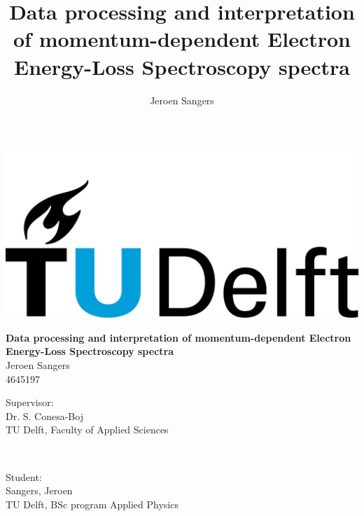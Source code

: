\begin{titlepage}

\title{ \huge \bfseries Data processing and interpretation of momentum-dependent Electron Energy-Loss Spectroscopy spectra  }
\author{Jeroen Sangers}

\maketitle

\thispagestyle{empty}

\vspace{10cm}

\begin{center}
    \includegraphics[width=0.4\linewidth,keepaspectratio]{Resources/Figures/titlepage/TUD.png}
\end{center}

\afterpage{\blankpage}

\end{titlepage}

\newpage

\begin{center}
    



 { \huge \bfseries Data processing and interpretation of momentum-dependent Electron Energy-Loss Spectroscopy spectra  }\\[3cm]
 
 { Jeroen Sangers}\\
 { 4645197}\\
 
\vfill
\begin{minipage}{0.45\linewidth}
    \begin{flushleft}
        Supervisor:\\
        Dr. S. Conesa-Boj\\
        TU Delft, Faculty of Applied Sciences\\
    \end{flushleft}
\end{minipage}
~
\begin{minipage}{0.45\linewidth}
    \begin{flushleft}
        Student:\\
        Sangers, Jeroen\\
        TU Delft, BSc program Applied Physics \\
    \end{flushleft}
\end{minipage}\\[1.5cm]

\end{center}
